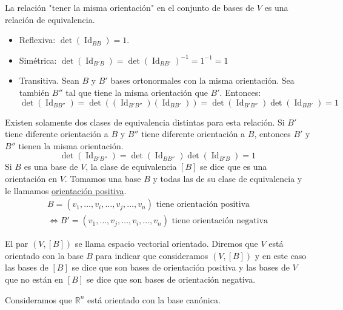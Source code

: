 \documentclass[12pt, a4paper, ones, notitlepage, openany,titlepage]{article}
\begin{document}
La relación "tener la misma orientación" en el conjunto de bases de $V$ es una relación de equivalencia.
\begin{itemize}
	\item Reflexiva: $\operatorname{det}(\operatorname{Id}_{BB}) = 1$.
	\item Simétrica: $\operatorname{det}(\operatorname{Id}_{B'B}) = \operatorname{det}(\operatorname{Id}_{BB'})^{-1} = 1^{-1} = 1$
	\item Transitiva. Sean $B$ y $B'$ bases ortonormales con la misma orientación. Sea también $B''$ tal que tiene la misma orientación que $B'$. Entonces:
	$$
	\operatorname{det}(\operatorname{Id}_{BB''}) = \operatorname{det}((\operatorname{Id}_{B'B''})(\operatorname{Id}_{BB'})) = \operatorname{det}(\operatorname{Id}_{B'B''})\operatorname{det}(\operatorname{Id}_{BB'}) = 1
	$$ 
\end{itemize}
\noindent Existen solamente dos clases de equivalencia distintas para esta relación. Si $B'$ tiene diferente orientación a $B$ y $B''$ tiene diferente orientación a $B$, entonces $B'$ y $B''$ tienen la misma orientación.
$$
\operatorname{det}(\operatorname{Id}_{B'B''}) = \operatorname{det}(\operatorname{Id}_{BB''})\operatorname{det}(\operatorname{Id}_{B'B}) = 1
$$
Si $B$ es una base de $V$, la clase de equivalencia $[B]$ se dice que es una orientación en $V$. Tomamos una base $B$ y todas las de su clase de equivalencia y le llamamos \underline{orientación positiva}.
\begin{gather*}
	B = (v_1,\ldots,v_i,\ldots,v_j,\ldots,v_n) \text{ tiene orientación positiva} \\
	\Longleftrightarrow B' = (v_1,\ldots,v_j,\ldots,v_i,\ldots,v_n) \text{ tiene orientación negativa}
\end{gather*}

El par $(V,[B])$ se llama espacio vectorial orientado. Diremos que $V$ está orientado con la base $B$ para indicar que consideramos $(V,[B])$ y en este caso las bases de $[B]$ se dice que son bases de orientación positiva y las bases de $V$ que no están en $[B]$ se dice que son bases de orientación negativa.

Consideramos que $\mathbb{R}^{n}$ está orientado con la base canónica.
\end{document}
